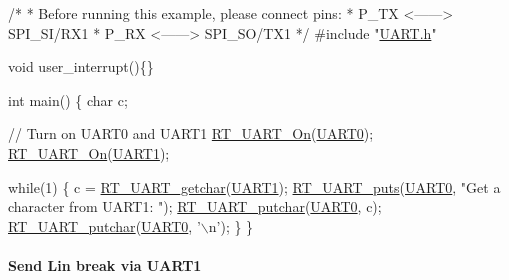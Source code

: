 \begin{DoxyCode}
\textcolor{comment}{/*}
\textcolor{comment}{ * Before running this example, please connect pins:}
\textcolor{comment}{ *      P\_TX <------> SPI\_SI/RX1}
\textcolor{comment}{ *      P\_RX <------> SPI\_SO/TX1  }
\textcolor{comment}{ */}
\textcolor{preprocessor}{#include "\mbox{\hyperlink{a00056}{UART.h}}"}

\textcolor{keywordtype}{void} user\_interrupt()\{\}

\textcolor{keywordtype}{int} main() \{
    \textcolor{keywordtype}{char} c;

    \textcolor{comment}{// Turn on UART0 and UART1}
    \mbox{\hyperlink{a00056_a7c1428a7b16eec7fe710679dd70b4069}{RT\_UART\_On}}(\mbox{\hyperlink{a00056_a0508661f121639ffdee7de2353a0def2}{UART0}});
    \mbox{\hyperlink{a00056_a7c1428a7b16eec7fe710679dd70b4069}{RT\_UART\_On}}(\mbox{\hyperlink{a00056_a8d69bf04d07af4fbbab5a8bd291f65ff}{UART1}});

    \textcolor{keywordflow}{while}(1) \{
        c = \mbox{\hyperlink{a00056_abc136df9d66fe27bf8ffcc319246591e}{RT\_UART\_getchar}}(\mbox{\hyperlink{a00056_a8d69bf04d07af4fbbab5a8bd291f65ff}{UART1}});
        \mbox{\hyperlink{a00056_ad61c03a00ccd43875563c16f97d61af7}{RT\_UART\_puts}}(\mbox{\hyperlink{a00056_a0508661f121639ffdee7de2353a0def2}{UART0}}, \textcolor{stringliteral}{"Get a character from UART1: "});
        \mbox{\hyperlink{a00056_ab03e9e1a8d4d9b97583db27174086108}{RT\_UART\_putchar}}(\mbox{\hyperlink{a00056_a0508661f121639ffdee7de2353a0def2}{UART0}}, c);
        \mbox{\hyperlink{a00056_ab03e9e1a8d4d9b97583db27174086108}{RT\_UART\_putchar}}(\mbox{\hyperlink{a00056_a0508661f121639ffdee7de2353a0def2}{UART0}}, \textcolor{charliteral}{'\(\backslash\)n'});
    \}
\}
\end{DoxyCode}


\paragraph*{Send Lin break via U\+A\+R\+T1}


